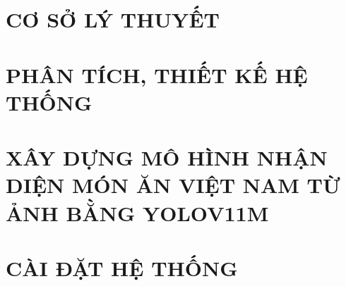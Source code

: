 \documentclass[a4paper,13pt,3p,twoside]{report}
\renewcommand{\headrulewidth}{0.4pt}
\renewcommand{\footrulewidth}{0.4pt}}
\theoremstyle{definition}
\begin{document}


% 


\clearpage
{}
\setcounter{page}{1}
\pagestyle{fancy}
\fancyhf{}
\fancyhead[R]{\small \nouppercase{\leftmark}}
\fancyfoot[R]{\small \thepage}
\renewcommand{\headrulewidth}{0.4pt}
\renewcommand{\footrulewidth}{0.4pt}


\newpage

\chapter{CƠ SỞ LÝ THUYẾT}
\label{chapter:Theoretical_basis}

\newpage
\chapter{PHÂN TÍCH, THIẾT KẾ HỆ THỐNG}
\label{chapter:System_analysis_design}

\newpage
\chapter{XÂY DỰNG MÔ HÌNH NHẬN DIỆN MÓN ĂN VIỆT NAM TỪ ẢNH BẰNG YOLOV11M}
\label{chapter:Model_building}

\newpage
\chapter{CÀI ĐẶT HỆ THỐNG}
\label{chapter:System_implementation}
\end{document}
